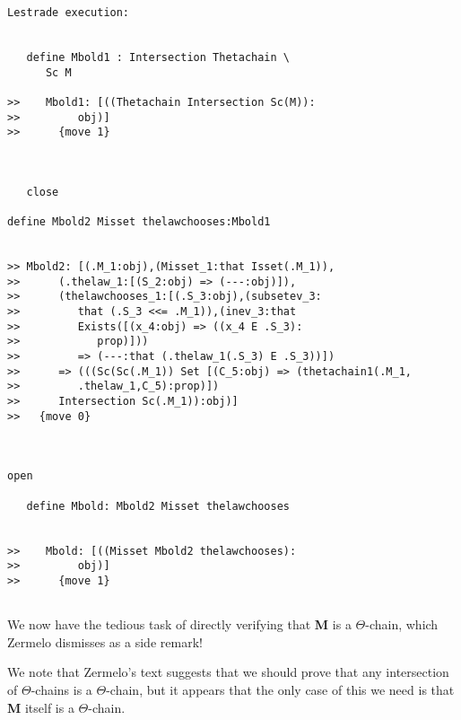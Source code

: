 \documentclass[12pt]{article}
\begin{document}
\begin{verbatim}Lestrade execution:


   define Mbold1 : Intersection Thetachain \
      Sc M

>>    Mbold1: [((Thetachain Intersection Sc(M)):
>>         obj)]
>>      {move 1}



   close

define Mbold2 Misset thelawchooses:Mbold1


>> Mbold2: [(.M_1:obj),(Misset_1:that Isset(.M_1)),
>>      (.thelaw_1:[(S_2:obj) => (---:obj)]),
>>      (thelawchooses_1:[(.S_3:obj),(subsetev_3:
>>         that (.S_3 <<= .M_1)),(inev_3:that
>>         Exists([(x_4:obj) => ((x_4 E .S_3):
>>            prop)]))
>>         => (---:that (.thelaw_1(.S_3) E .S_3))])
>>      => (((Sc(Sc(.M_1)) Set [(C_5:obj) => (thetachain1(.M_1,
>>         .thelaw_1,C_5):prop)])
>>      Intersection Sc(.M_1)):obj)]
>>   {move 0}



open

   define Mbold: Mbold2 Misset thelawchooses


>>    Mbold: [((Misset Mbold2 thelawchooses):
>>         obj)]
>>      {move 1}


\end{verbatim}

We now have the tedious task of directly verifying that {\bf M} is a $\Theta$-chain, which Zermelo dismisses as a side remark!

We note that Zermelo's text suggests that we should prove that any intersection of $\Theta$-chains is a $\Theta$-chain, but it appears that the only case
of this we need is that  {\bf M} itself is a $\Theta$-chain.
\end{document}
